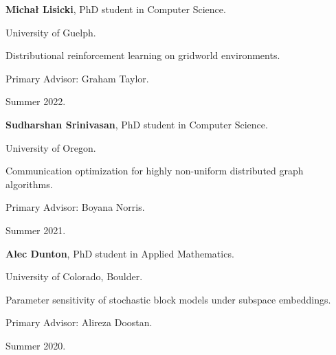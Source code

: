 \begin{innerlist}
  \item[] \textbf{Micha{\l}
    Lisicki},
  PhD student in Computer Science.
  \begin{innerlist}
    \item[-] University of Guelph.
    \item[-] Distributional reinforcement learning on gridworld environments.
    \item[-] Primary Advisor: Graham Taylor.
    \item[-] Summer 2022.
  \end{innerlist}

  \item[] \textbf{Sudharshan Srinivasan},
  PhD student in Computer Science.
  \begin{innerlist}
    \item[-] University of Oregon.
    \item[-] Communication optimization for highly non-uniform distributed graph algorithms.
    \item[-] Primary Advisor: Boyana Norris.
    \item[-] Summer 2021.
  \end{innerlist}

  \item[] \textbf{Alec Dunton},
  PhD student in Applied Mathematics.
  \begin{innerlist}
    \item[-] University of Colorado, Boulder.
    \item[-] Parameter sensitivity of stochastic block models under subspace embeddings.
    \item[-] Primary Advisor: Alireza Doostan.
    \item[-] Summer 2020.
  \end{innerlist}

\end{innerlist}
